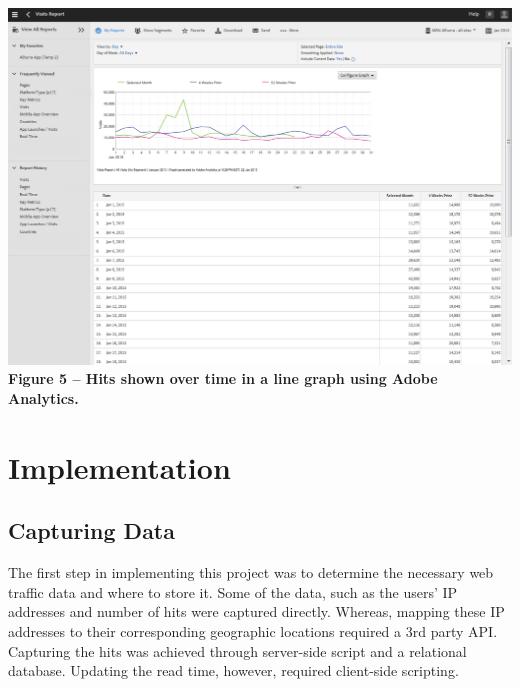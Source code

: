 \documentclass[12pt]{article}
\begin{document}
\noindent\includegraphics[scale=0.4]{img/adobe} \\
\noindent\textbf{Figure 5 -- Hits shown over time in a line graph using Adobe Analytics.} \\

\vfill


\section{Implementation}
\subsection{Capturing Data}
The first step in implementing this project was to determine the necessary web traffic data and where to store it. Some of the data, such as the users' IP addresses and number of hits were captured directly. Whereas, mapping these IP addresses to their corresponding geographic locations required a 3rd party API. Capturing the hits was achieved through server-side script and a relational database. Updating the read time, however, required client-side scripting.   
\end{document}
